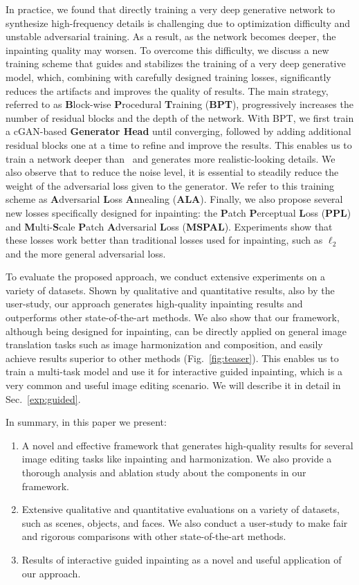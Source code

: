 In practice, we found that directly training a very deep generative network to synthesize high-frequency details is challenging due to optimization difficulty and unstable adversarial training. As a result, as the network becomes deeper, the inpainting quality may worsen. To overcome this difficulty, we discuss a new training scheme that guides and stabilizes the training of a very deep generative model, which, combining with carefully designed training losses, significantly reduces the artifacts and improves the quality of results. The main strategy, referred to as \textbf{B}lock-wise \textbf{P}rocedural \textbf{T}raining (\textbf{BPT}), progressively increases the number of residual blocks and the depth of the network. With BPT, we first train a cGAN-based \textbf{Generator Head} until converging, followed by adding additional residual blocks one at a time to refine and improve the results. This enables us to train a network deeper than~\cite{iizuka2017globally} and generates more realistic-looking details. We also observe that to reduce the noise level, it is essential to steadily reduce the weight of the adversarial loss given to the generator. We refer to this training scheme as \textbf{A}dversarial \textbf{L}oss \textbf{A}nnealing (\textbf{ALA}). Finally, we also propose several new losses specifically designed for inpainting: the \textbf{P}atch \textbf{P}erceptual \textbf{L}oss (\textbf{PPL}) and \textbf{M}ulti-\textbf{S}cale \textbf{P}atch \textbf{A}dversarial \textbf{L}oss (\textbf{MSPAL}). Experiments show that these losses work better than traditional losses used for inpainting, such as $\ell_2$ and the more general adversarial loss.

To evaluate the proposed approach, we conduct extensive experiments on a variety of datasets. Shown by qualitative and quantitative results, also by the user-study, our approach generates high-quality inpainting results and outperforms other state-of-the-art methods.  We also show that our framework, although being designed for inpainting, can be directly applied on general image translation tasks such as image harmonization and composition, and easily achieve results superior to other methods (Fig.~\ref{fig:teaser}). This enables us to train a multi-task model and use it for interactive guided inpainting, which is a very common and useful image editing scenario. We will describe it in detail in Sec.~\ref{exp:guided}.

In summary, in this paper we present:
\begin{enumerate}
\item A novel and effective framework that generates high-quality results for several image editing tasks like inpainting and harmonization. We also provide a thorough analysis and ablation study about the components in our framework.  
\item Extensive qualitative and quantitative evaluations on a variety of datasets, such as scenes, objects, and faces. We also conduct a user-study to make fair and rigorous comparisons with other state-of-the-art methods. 
\item Results of interactive guided inpainting as a novel and useful application of our approach. 
\end{enumerate}